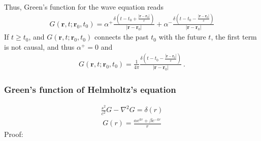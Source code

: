 \documentclass[letterpaper,10pt,english]{jupyterBook}
\begin{document}
\sphinxAtStartPar
Thus, Green’s function for the wave equation reads
\begin{equation*}
\begin{split}G(\mathbf{r},t; \mathbf{r}_0, t_0) = 
  \alpha^+ \frac{ \delta \left( t - t_0 + \frac{|\mathbf{r}-\mathbf{r}_0|}{c} \right)}{|\mathbf{r} - \mathbf{r}_0|} +
  \alpha^- \frac{ \delta \left( t - t_0 - \frac{|\mathbf{r}-\mathbf{r}_0|}{c} \right)}{|\mathbf{r} - \mathbf{r}_0|}
\end{split}
\end{equation*}
\sphinxAtStartPar
If \(t \ge t_0\), and \(G(\mathbf{r}, t; \mathbf{r}_0, t_0)\) connects the past \(t_0\) with the future \(t\), the first term is not causal, and thus \(\alpha^+ = 0\) and
\begin{equation*}
\begin{split}G(\mathbf{r},t; \mathbf{r}_0, t_0) = \frac{1}{4 \pi} \frac{ \delta \left( t - t_0 - \frac{|\mathbf{r}-\mathbf{r}_0|}{c} \right)}{|\mathbf{r} - \mathbf{r}_0|} \ .\end{split}
\end{equation*}\subsubsection*{Green’s function of Helmholtz’s equation}
\begin{equation*}
\begin{split}\frac{s^2}{c^2} G - \nabla^2 G = \delta(r)\end{split}
\end{equation*}\begin{equation*}
\begin{split}G(r) = \frac{\alpha e^{k r} + \beta e^{-kr}}{r}\end{split}
\end{equation*}
\sphinxAtStartPar
Proof:
\end{document}
